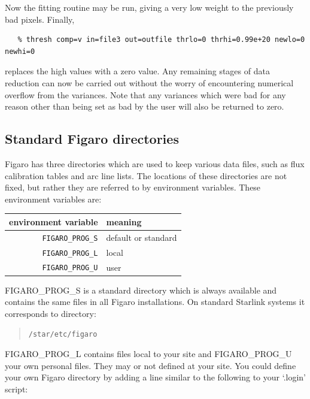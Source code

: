 Now the fitting routine may be run, giving a very low weight to the
previously bad pixels. Finally,

\begin{verbatim}
   % thresh comp=v in=file3 out=outfile thrlo=0 thrhi=0.99e+20 newlo=0 newhi=0
\end{verbatim}

replaces the high values with a zero value. Any remaining stages of data
reduction can now be carried out without the worry of encountering
numerical overflow from the variances. Note that any variances which were
bad for any reason other than being set as bad by the user will also be
returned to zero.



\subsection{\label{figaro_directories}Standard
            Figaro directories}

Figaro has three directories which are used to keep various data files,
such as flux calibration tables and arc line lists.  The locations of these
directories are not fixed, but rather they are referred to by environment
variables.  These environment variables are:

\begin{center}
\begin{tabular}{rl}
environment variable & meaning  \\ \hline
{\tt FIGARO\_PROG\_S} & default or standard \\
{\tt FIGARO\_PROG\_L} & local   \\
{\tt FIGARO\_PROG\_U} & user    \\
\end{tabular}
\end{center}

FIGARO\_PROG\_S is a standard directory which is always available and
contains the same files in all Figaro installations.  On standard Starlink
systems it corresponds to directory:

\begin{quote}
{\tt /star/etc/figaro}
\end{quote}

FIGARO\_PROG\_L contains files local to your site and FIGARO\_PROG\_U
your own personal files.  They may or not defined at your site.  You
could define your own Figaro directory by adding a line similar to the
following to your `.login' script:

